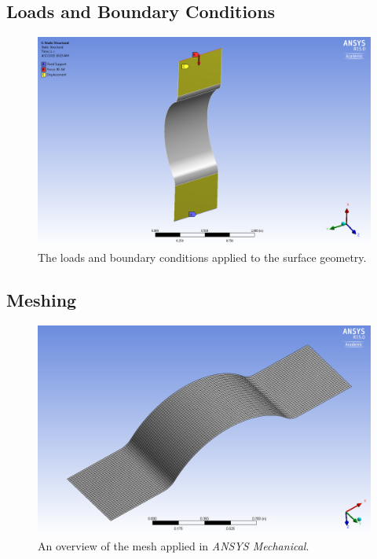 \subsection{Loads and Boundary Conditions}

\begin{figure}[htp]
\centering
\includegraphics[width=1\textwidth]{./figures/fea/fea-mechanical-loads-bc}
\caption{The loads and boundary conditions applied to the surface geometry.}
\label{fig:fea-loads-bcs}
\end{figure}

\clearpage

\subsection{Meshing}

\begin{figure}[htp]
\centering
\includegraphics[width=1\textwidth]{./figures/fea/fea-mechanical-mesh-surface}
\caption{An overview of the mesh applied in \textit{ANSYS Mechanical}.}
\label{fig:fea-mechanical-mesh-surface}
\end{figure}

